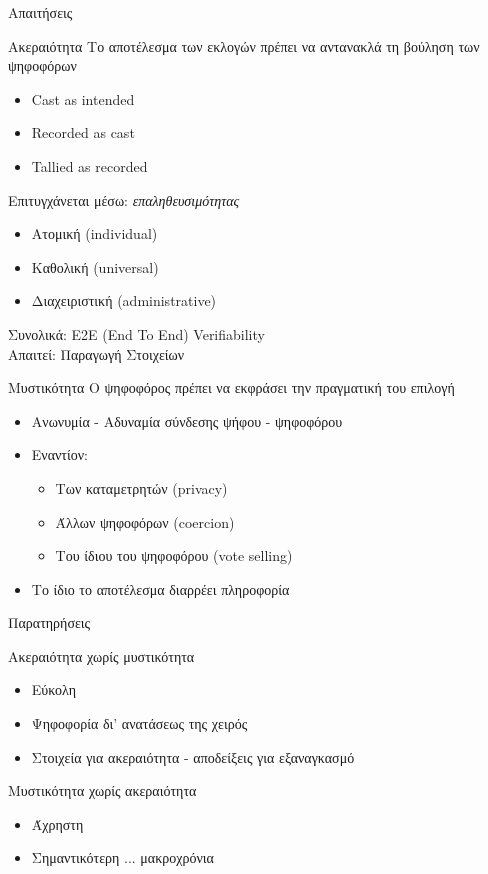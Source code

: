 \documentclass[handout]{beamer}
\begin{document}
\begin{section}{Απαιτήσεις}

\begin{frame}{Ακεραιότητα}
Το αποτέλεσμα των εκλογών πρέπει να αντανακλά τη βούληση των ψηφοφόρων \pause
\begin{itemize}
     \item Cast as intended
     \item Recorded as cast
     \item Tallied as recorded
\end{itemize} \pause
Επιτυγχάνεται μέσω: \textit{επαληθευσιμότητας}
\begin{itemize} \pause
    \item Ατομική (individual)
    \item Καθολική (universal)
    \item Διαχειριστική (administrative)
\end{itemize} \pause
Συνολικά: E2E (End To End) Verifiability \\
Απαιτεί: Παραγωγή Στοιχείων
\end{frame}

\begin{frame}{Μυστικότητα}
O ψηφοφόρος πρέπει να εκφράσει την πραγματική του επιλογή \pause
\begin{itemize} 
\item Ανωνυμία - Αδυναμία σύνδεσης ψήφου - ψηφοφόρου
\item Εναντίον: \pause
\begin{itemize}
    \item Των καταμετρητών (privacy)
    \item Άλλων ψηφοφόρων (coercion)
    \item Του ίδιου του ψηφοφόρου (vote selling)
\end{itemize} \pause
\item Το ίδιο το αποτέλεσμα διαρρέει πληροφορία
\end{itemize}
\end{frame}

\begin{frame}{Παρατηρήσεις}
\begin{block}{Ακεραιότητα χωρίς μυστικότητα}
\begin{itemize}
\item Εύκολη 
\item Ψηφοφορία δι' ανατάσεως της χειρός
\item Στοιχεία για ακεραιότητα - αποδείξεις για εξαναγκασμό
\end{itemize}
\end{block}
\pause
\begin{block}{Μυστικότητα χωρίς ακεραιότητα}
\begin{itemize}
\item Άχρηστη
\item Σημαντικότερη ... μακροχρόνια
\end{itemize}
\end{block}
\end{frame}


\end{section}
\end{document}
